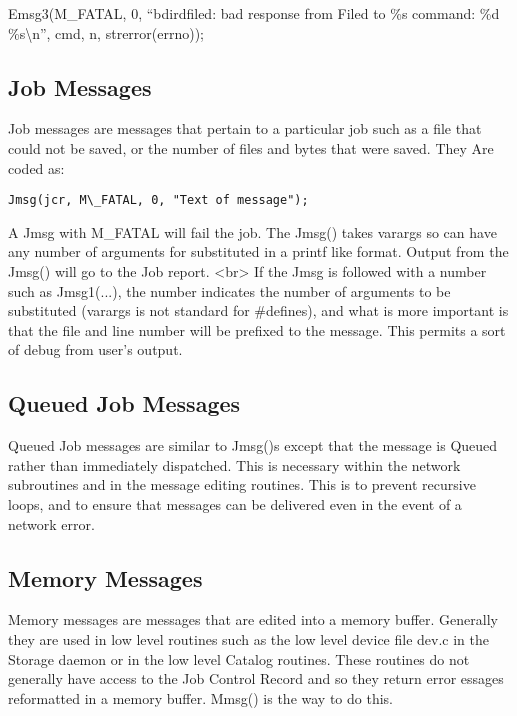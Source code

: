 Emsg3(M\_FATAL, 0, ``bdird\lt{}filed: bad response from Filed to \%s command:
\%d \%s\textbackslash{}n'',  cmd, n, strerror(errno)); 

\subsection{Job Messages}

Job messages are messages that pertain to a particular job such as a file that
could not be saved, or the number of files and bytes that were saved. They
Are coded as:
\begin{verbatim}
Jmsg(jcr, M\_FATAL, 0, "Text of message");
\end{verbatim}
A Jmsg with M\_FATAL will fail the job. The Jmsg() takes varargs so can
have any number of arguments for substituted in a printf like format.
Output from the Jmsg() will go to the Job report.
<br>
If the Jmsg is followed with a number such as Jmsg1(...), the number
indicates the number of arguments to be substituted (varargs is not
standard for \#defines), and what is more important is that the file and
line number will be prefixed to the message. This permits a sort of debug
from user's output.

\subsection{Queued Job Messages}
Queued Job messages are similar to Jmsg()s except that the message is
Queued rather than immediately dispatched. This is necessary within the
network subroutines and in the message editing routines. This is to prevent
recursive loops, and to ensure that messages can be delivered even in the
event of a network error.


\subsection{Memory Messages}

Memory messages are messages that are edited into a memory buffer. Generally
they are used in low level routines such as the low level device file dev.c in
the Storage daemon or in the low level Catalog routines. These routines do not
generally have access to the Job Control Record and so they return error
essages reformatted in a memory buffer. Mmsg() is the way to do this. 

